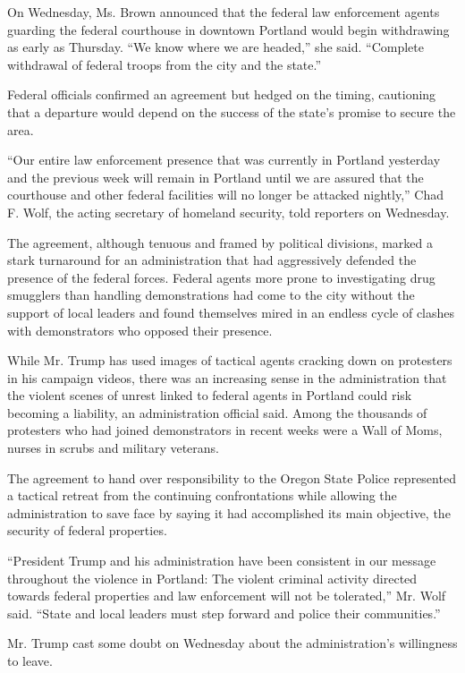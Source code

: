 On Wednesday, Ms. Brown announced that the federal law enforcement
agents guarding the federal courthouse in downtown Portland would begin
withdrawing as early as Thursday. ``We know where we are headed,'' she
said. ``Complete withdrawal of federal troops from the city and the
state.''

Federal officials confirmed an agreement but hedged on the timing,
cautioning that a departure would depend on the success of the state's
promise to secure the area.

``Our entire law enforcement presence that was currently in Portland
yesterday and the previous week will remain in Portland until we are
assured that the courthouse and other federal facilities will no longer
be attacked nightly,'' Chad F. Wolf, the acting secretary of homeland
security, told reporters on Wednesday.

The agreement, although tenuous and framed by political divisions,
marked a stark turnaround for an administration that had aggressively
defended the presence of the federal forces. Federal agents more prone
to investigating drug smugglers than handling demonstrations had come to
the city without the support of local leaders and found themselves mired
in an endless cycle of clashes with demonstrators who opposed their
presence.

While Mr. Trump has used images of tactical agents cracking down on
protesters in his campaign videos, there was an increasing sense in the
administration that the violent scenes of unrest linked to federal
agents in Portland could risk becoming a liability, an administration
official said. Among the thousands of protesters who had joined
demonstrators in recent weeks were a Wall of Moms, nurses in scrubs and
military veterans.

The agreement to hand over responsibility to the Oregon State Police
represented a tactical retreat from the continuing confrontations while
allowing the administration to save face by saying it had accomplished
its main objective, the security of federal properties.

``President Trump and his administration have been consistent in our
message throughout the violence in Portland: The violent criminal
activity directed towards federal properties and law enforcement will
not be tolerated,'' Mr. Wolf said. ``State and local leaders must step
forward and police their communities.''

Mr. Trump cast some doubt on Wednesday about the administration's
willingness to leave.

